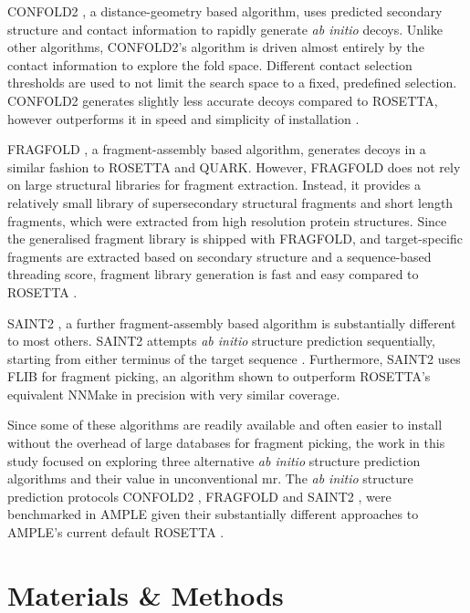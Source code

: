 CONFOLD2 \cite{Adhikari2018-lj}, a distance-geometry based algorithm, uses predicted secondary structure and contact information to rapidly generate \textit{ab initio} decoys. Unlike other algorithms, CONFOLD2's algorithm is driven almost entirely by the contact information to explore the fold space. Different contact selection thresholds are used to not limit the search space to a fixed, predefined selection. CONFOLD2 generates slightly less accurate decoys compared to ROSETTA, however outperforms it in speed and simplicity of installation \cite{Adhikari2018-lj,Michel2017-xh}.

FRAGFOLD \cite{Jones2001-mc}, a fragment-assembly based algorithm, generates decoys in a similar fashion to ROSETTA and QUARK. However, FRAGFOLD does not rely on large structural libraries for fragment extraction. Instead, it provides a relatively small library of supersecondary structural fragments and short length fragments, which were extracted from high resolution protein structures. Since the generalised fragment library is shipped with FRAGFOLD, and target-specific fragments are extracted based on secondary structure and a sequence-based threading score, fragment library generation is fast and easy compared to ROSETTA \cite{Kosciolek2014-bt}.

SAINT2 \cite{De_Oliveira2018-sg}, a further fragment-assembly based algorithm is substantially different to most others. SAINT2 attempts \textit{ab initio} structure prediction sequentially, starting from either terminus of the target sequence \cite{De_Oliveira2018-sg}. Furthermore, SAINT2 uses FLIB \cite{De_Oliveira2015-kb} for fragment picking, an algorithm shown to outperform ROSETTA's equivalent NNMake \cite{Gront2011-sv} in precision with very similar coverage.

Since some of these algorithms are readily available and often easier to install without the overhead of large databases for fragment picking, the work in this study focused on exploring three alternative \textit{ab initio} structure prediction algorithms and their value in unconventional \gls{mr}. The \textit{ab initio} structure prediction protocols CONFOLD2 \cite{Adhikari2018-lj}, FRAGFOLD \cite{Jones2001-mc} and SAINT2 \cite{De_Oliveira2018-sg}, were benchmarked in AMPLE given their substantially different approaches to AMPLE's current default ROSETTA \cite{Rohl2004-dj}.

\section{Materials \& Methods}
